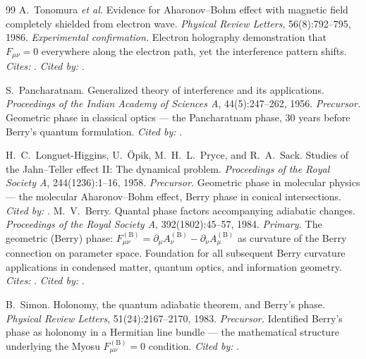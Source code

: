 \documentclass[12pt,a4paper]{article}
\begin{document}
\begin{thebibliography}{99}
A.~Tonomura \emph{et al.}
\newblock Evidence for Aharonov--Bohm effect with magnetic field completely shielded
from electron wave.
\newblock \emph{Physical Review Letters}, 56(8):792--795, 1986.
\newblock \textit{Experimental confirmation.} Electron holography demonstration that
$F_{\mu\nu}=0$ everywhere along the electron path, yet the interference pattern shifts.
\textit{Cites:} \cite{aharonov1959}. \textit{Cited by:} \cite{peshkin1989,nakahara2003}.

S.~Pancharatnam.
\newblock Generalized theory of interference and its applications.
\newblock \emph{Proceedings of the Indian Academy of Sciences A}, 44(5):247--262, 1956.
\newblock \textit{Precursor.} Geometric phase in classical optics --- the Pancharatnam phase,
30 years before Berry's quantum formulation. \textit{Cited by:} \cite{berry1984,shapere1989}.

H.~C.~Longuet-Higgins, U.~\"Opik, M.~H.~L.~Pryce, and R.~A.~Sack.
\newblock Studies of the Jahn--Teller effect II: The dynamical problem.
\newblock \emph{Proceedings of the Royal Society A}, 244(1236):1--16, 1958.
\newblock \textit{Precursor.} Geometric phase in molecular physics --- the molecular
Aharonov--Bohm effect, Berry phase in conical intersections.
\textit{Cited by:} \cite{berry1984,shapere1989}.
M.~V.~Berry.
\newblock Quantal phase factors accompanying adiabatic changes.
\newblock \emph{Proceedings of the Royal Society A}, 392(1802):45--57, 1984.
\newblock \textit{Primary.} The geometric (Berry) phase: $F_{\mu\nu}^{(\mathrm{B})} = \partial_\mu
A_\nu^{(\mathrm{B})} - \partial_\nu A_\mu^{(\mathrm{B})}$ as curvature of the
Berry connection on parameter space. Foundation for all subsequent Berry curvature
applications in condensed matter, quantum optics, and information geometry.
\newblock \textit{Cites:} \cite{pancharatnam1956,longuethiggins1958,aharonov1959}.
\textit{Cited by:} \cite{simon1983,shapere1989,amari2000,fujikawa2007}.

B.~Simon.
\newblock Holonomy, the quantum adiabatic theorem, and Berry's phase.
\newblock \emph{Physical Review Letters}, 51(24):2167--2170, 1983.
\newblock \textit{Precursor.} Identified Berry's phase as holonomy in a Hermitian line bundle
--- the mathematical structure underlying the Myosu $F_{\mu\nu}^{(\mathrm{B})}=0$
condition. \textit{Cited by:} \cite{berry1984,nakahara2003}.


\end{thebibliography}
\end{document}

